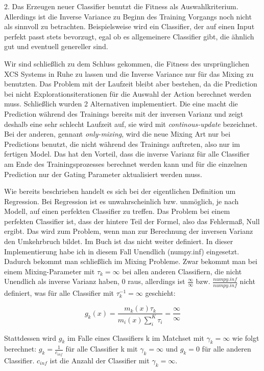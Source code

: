 \documentclass[10pt]{ocsmnar}
\begin{document}
2. Das Erzeugen neuer Classifier benutzt die Fitness als Auswahlkriterium. Allerdings ist die Inverse Variance zu Beginn des Training Vorgangs noch nicht als sinnvoll zu betrachten. Beispielsweise wird ein Classifier, der auf einen Input perfekt passt stets bevorzugt, egal ob es allgemeinere Classifier gibt, die ähnlich gut und eventuell genereller sind.  

Wir sind schließlich zu dem Schluss gekommen, die Fitness des ursprünglichen XCS Systems in Ruhe zu lassen und die Inverse Variance nur für das Mixing zu benutzten. Das Problem mit der Laufzeit bleibt aber bestehen, da die Prediction bei nicht Explorationsiterationen für die Auswahl der Action berechnet werden muss. Schließlich wurden 2 Alternativen implementiert. Die eine macht die Prediction während des Trainings bereits mit der inversen Varianz und zeigt deshalb eine sehr schlecht Laufzeit auf, sie wird mit \textit{continous-update} bezeichnet. Bei der anderen, gennant \textit{only-mixing}, wird die neue Mixing Art nur bei Predictions benutzt, die nicht während des Trainings auftreten, also nur im fertigen Model. Das hat den Vorteil, dass die inverse Varianz für alle Classifier am Ende des Trainingsprozesses berechnet werden kann und für die einzelnen Prediction nur der Gating Parameter aktualisiert werden muss.  
 


Wie bereits beschrieben handelt es sich bei der eigentlichen Definition um Regression. Bei Regression ist es unwahrscheinlich bzw. unmöglich, je nach Modell, auf einen perfekten Classifier zu treffen. Das Problem bei einem perfekten Classifier ist, dass der hintere Teil der Formel, also das Fehlermaß, Null ergibt. Das wird zum Problem, wenn man zur Berechnung der inversen Varianz den Umkehrbruch bildet. Im Buch ist das nicht weiter definiert. In dieser Implementierung habe ich in diesem Fall Unendlich (numpy.inf) eingesetzt. Dadurch bekommt man schließlich im Mixing Probleme. Zwar bekommt man bei einem Mixing-Parameter mit  $\tau_{k} =   \infty$ bei allen anderen Classifiern, die nicht Unendlich als inverse Varianz haben, 0 raus, allerdings ist $\frac{\infty}{\infty}$ bzw. $\frac{numpy.inf}{numpy.inf}$ nicht definiert, was für alle Classifier mit $\tau_{k}^{-1} = \infty$ geschieht:

$$ g_k(x) = \frac{m_k(x)\tau_k}{m_i(x)\sum_i^K \tau_i} = \frac{\infty}{\infty} $$

Stattdessen wird $g_{k}$ im Falle eines Classifiers k im Matchset mit $\gamma_{k} = \infty$ wie folgt berechnet: $g_{k} = \frac{1}{c_{inf}} $ für alle Classifier k mit $\gamma_{k} = \infty$ und $g_{k} = 0$ für alle anderen Classifier. $c_{inf}$ ist die Anzahl der Classifier mit $\gamma_{k} = \infty$.
\end{document}
